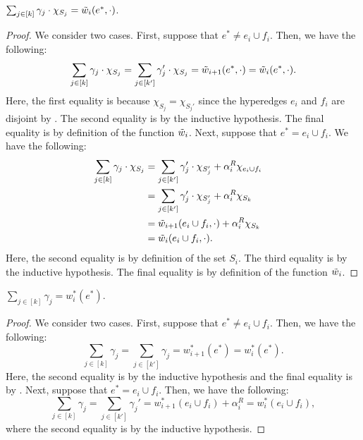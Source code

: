 \begin{claim}\label{claim:weak-to-strong:correctness:main:hyperedge-merge:property3}
     $\sum_{j \in [k]}\gamma_j\cdot \chi_{S_j} = \Tilde{w}_i(e^*, \cdot)$.
\end{claim}
\begin{proof}
    We consider two cases. First, suppose that $e^* \not = e_i\cup f_i$. Then, we have the following:
    $$\sum_{j \in [k]}\gamma_j\cdot \chi_{S_j} = \sum_{j \in [k']}\gamma_j'\cdot \chi_{S_j} = \Tilde{w}_{i+1}(e^*, \cdot) = \Tilde{w}_i(e^*, \cdot).$$
    Here, the first equality is because $\chi_{S_j} = \chi_{S_j'}$ since the hyperedges $e_i$ and $f_i$ are disjoint by . The second equality is by the inductive hypothesis. The final equality is by definition of the function $\Tilde{w}_i$. Next, suppose that $e^* = e_i\cup f_i$. We have the following:
    \begin{align*}
        \sum_{j \in [k]}\gamma_j\cdot \chi_{S_j}& = \sum_{j \in [k']}\gamma_j'\cdot \chi_{S_j'} + \alpha_i^R\chi_{e_i\cup f_i} &\\
        &= \sum_{j \in [k']}\gamma_j'\cdot \chi_{S_j'} + \alpha_i^R\chi_{S_k}&\\
        &= \Tilde{w}_{i+1}(e_i\cup f_i, \cdot) + \alpha_i^R\chi_{S_k}&\\
        &= \Tilde{w}_i(e_i\cup f_i, \cdot).&
    \end{align*}
    Here, the second equality is by definition of the set $S_i$. The third equality is by the inductive hypothesis. The final equality is by definition of the function $\Tilde{w}_i$.
\end{proof}

\begin{claim}\label{claim:weak-to-strong:correctness:main:hyperedge-merge:property4}
    $\sum_{j \in [k]}\gamma_j = w_i^*(e^*)$.
\end{claim}
\begin{proof}
    We consider two cases. First, suppose that $e^* \not = e_i\cup f_i$. Then, we have the following:
    $$\sum_{j \in [k]}\gamma_j = \sum_{j \in [k']}\gamma_j = w^*_{i+1}(e^*) = w_i^*(e^*).$$
    Here, the second equality is by the inductive hypothesis and the final equality is by . Next, suppose that $e^* = e_i \cup f_i$. Then, we have the following:
    $$\sum_{j \in [k]}\gamma_j = \sum_{j \in [k']}\gamma_j' = w^*_{i+1}(e_i\cup f_i) + \alpha_i^R= w_i^*(e_i\cup f_i),$$
    where the second equality is by the inductive hypothesis.
\end{proof}
\fi

